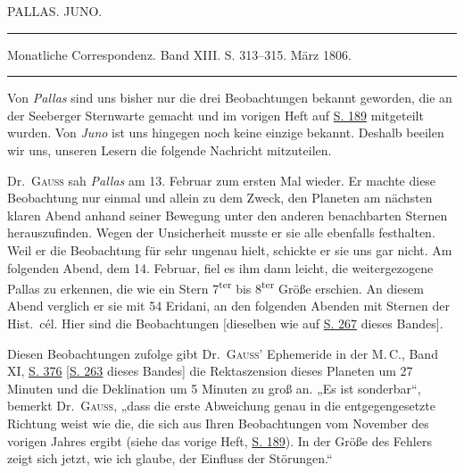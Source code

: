 \clearpage
{}
\hypertarget{native-274-lower}{}
\begin{center}
PALLAS. JUNO.

\rule{0.6\linewidth}{0.4pt}

Monatliche Correspondenz. Band XIII. S. 313–315. März 1806.

\rule{0.6\linewidth}{0.4pt}
\end{center}

\par\indent Von \emph{Pallas} sind uns bisher nur die drei Beobachtungen bekannt geworden, die an der Seeberger Sternwarte gemacht und im vorigen Heft auf \href{https://www.digitale-sammlungen.de/en/view/bsb10538605?page=197}{S. 189} mitgeteilt wurden. Von \emph{Juno} ist uns hingegen noch keine einzige bekannt. Deshalb beeilen wir uns, unseren Lesern die folgende Nachricht mitzuteilen.

\par\indent Dr.\ \textsc{Gauss} sah \emph{Pallas} am 13. Februar zum ersten Mal wieder. Er machte diese Beobachtung nur einmal und allein zu dem Zweck, den Planeten am nächsten klaren Abend anhand seiner Bewegung unter den anderen benachbarten Sternen herauszufinden. Wegen der Unsicherheit musste er sie alle ebenfalls festhalten. Weil er die Beobachtung für sehr ungenau hielt, schickte er sie uns gar nicht. Am folgenden Abend, dem 14. Februar, fiel es ihm dann leicht, die weitergezogene Pallas zu erkennen, die wie ein Stern 7\textsuperscript{ter} bis 8\textsuperscript{ter} Größe erschien. An diesem Abend verglich er sie mit 54 Eridani, an den folgenden Abenden mit Sternen der Hist.\ cél. Hier sind die Beobachtungen [dieselben wie auf \hyperlink{native-272}{S. 267} dieses Bandes].

\par\indent Diesen Beobachtungen zufolge gibt Dr.\ \textsc{Gauss}’ Ephemeride in der M.\,C., Band XI, \href{https://www.digitale-sammlungen.de/en/view/bsb10538603?page=388}{S. 376} [\hyperlink{pallas180504.1}{S. 263} dieses Bandes] die Rektaszension dieses Planeten um 27 Minuten und die Deklination um 5 Minuten zu groß an. „Es ist sonderbar“, bemerkt Dr.\ \textsc{Gauss}, „dass die erste Abweichung genau in die entgegengesetzte Richtung weist wie die, die sich aus Ihren Beobachtungen vom November des vorigen Jahres ergibt (siehe das vorige Heft, \href{https://www.digitale-sammlungen.de/en/view/bsb10538605?page=197}{S. 189}). In der Größe des Fehlers zeigt sich jetzt, wie ich glaube, der Einfluss der Störungen.“

